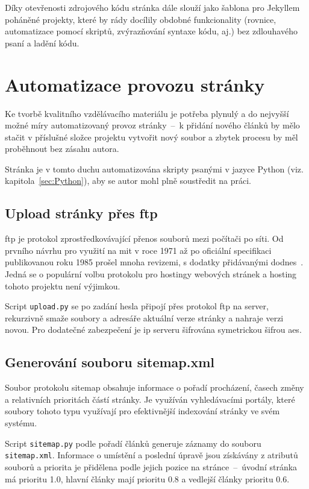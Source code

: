 \documentclass[a4paper, 12pt]{article}
\begin{document}
  Díky otevřenosti zdrojového kódu stránka dále slouží jako šablona pro Jekyllem poháněné projekty, které by rády docílily obdobné funkcionality (rovnice, automatizace pomocí skriptů, zvýrazňování syntaxe kódu, aj.) bez zdlouhavého psaní a ladění kódu.


  \section{Automatizace provozu stránky} \label{sec:Automatizace provozu stránky}
  Ke tvorbě kvalitního vzdělávacího materiálu je potřeba plynulý a do nejvyšší možné míry automatizovaný provoz stránky~--~k přidání nového článků by mělo stačit v příslušné složce projektu vytvořit nový soubor a zbytek procesu by měl proběhnout bez zásahu autora.

  Stránka je v tomto duchu automatizována skripty psanými v jazyce Python (viz. kapitola~\ref{sec:Python}), aby se autor mohl plně soustředit na práci.


  \subsection{Upload stránky přes \acrshort{ftp}}
  \gls{ftp} je protokol zprostředkovávající přenos souborů mezi počítači po síti. Od prvního návrhu pro využití na \gls{mit} v roce 1971 až po oficiální specifikaci publikovanou roku 1985 prošel mnoha revizemi, s dodatky přidávanými dodnes~\cite{ftp-specification}. Jedná se o populární volbu protokolu pro hostingy webových stránek a hosting tohoto projektu není výjimkou.

  Script \texttt{upload.py} se po zadání hesla připojí přes protokol \gls{ftp} na server, rekurzivně smaže soubory a adresáře aktuální verze stránky a nahraje verzi novou. Pro dodatečné zabezpečení je \gls{ip} serveru šifrována symetrickou šifrou \gls{aes}.


  \subsection{Generování souboru sitemap.xml}
  Soubor protokolu sitemap obsahuje informace o pořadí procházení, časech změny a relativních prioritách částí stránky. Je využíván vyhledávacími portály, které soubory tohoto typu využívají pro efektivnější indexování stránky ve svém systému.

  Script \texttt{sitemap.py} podle pořadí článků generuje záznamy do souboru \texttt{sitemap.xml}. Informace o umístění a poslední úpravě jsou získávány z atributů souborů a priorita je přidělena podle jejich pozice na stránce~--~úvodní stránka má prioritu \num{1.0}, hlavní články mají prioritu \num{0.8} a vedlejší články prioritu \num{0.6}.
\end{document}
